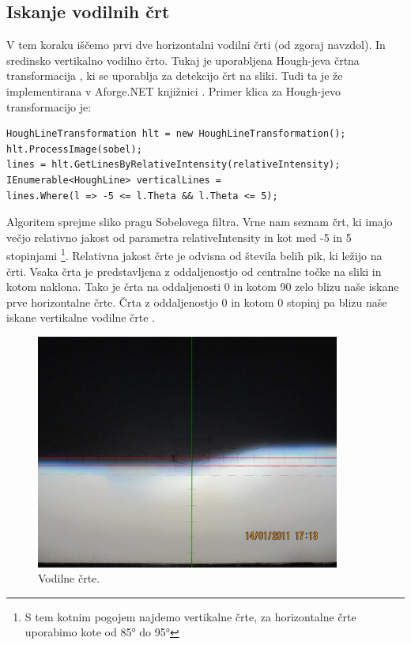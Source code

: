 \documentclass[oneside, a4paper, 12pt]{book}
\begin{document}
\subsection{Iskanje vodilnih črt}
V tem koraku iščemo prvi dve horizontalni vodilni črti (od zgoraj navzdol). In sredinsko vertikalno vodilno črto. Tukaj je uporabljena Hough-jeva črtna transformacija \cite{hough-wiki}, ki se uporablja za detekcijo črt na sliki. Tudi ta je že implementirana v Aforge.NET knjižnici \cite{hough}. Primer klica za Hough-jevo transformacijo je:

\begin{verbatim}
HoughLineTransformation hlt = new HoughLineTransformation();
hlt.ProcessImage(sobel);
lines = hlt.GetLinesByRelativeIntensity(relativeIntensity);
IEnumerable<HoughLine> verticalLines = 
lines.Where(l => -5 <= l.Theta && l.Theta <= 5);
\end{verbatim}


Algoritem sprejme sliko pragu Sobelovega filtra. Vrne nam seznam črt, ki imajo večjo relativno jakost od parametra relativeIntensity \cite{hough} in kot med -5 in 5 stopinjami \footnote{S tem kotnim pogojem najdemo vertikalne črte, za horizontalne črte uporabimo kote od 85° do 95°}. Relativna jakost črte je odvisna od števila belih pik, ki ležijo na črti. Vsaka črta je predstavljena z oddaljenostjo od centralne točke na sliki in kotom naklona. Tako je črta na oddaljenosti 0 in kotom 90 zelo blizu naše iskane prve horizontalne črte. Črta z oddaljenostjo 0 in kotom 0 stopinj pa blizu naše iskane vertikalne vodilne črte \cite{hough}. 

\begin{figure}
\begin{center}
\includegraphics[width=10cm]{slike/vodilne-crte.jpg}
\end{center}
\caption{Vodilne črte.}
\label{pic:vodilne-crte}
\end{figure}
\end{document}

